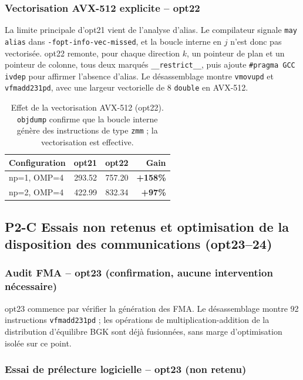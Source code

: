 \documentclass[a4paper,11pt,oneside]{report}
\newcommand{\code}[1]{\texttt{#1}}
\begin{document}
\subsubsection{Vectorisation AVX-512 explicite -- opt22}

La limite principale d'opt21 vient de l'analyse d'alias. Le compilateur signale
\code{may alias} dans \code{-fopt-info-vec-missed}, et la boucle interne en $j$ n'est donc pas vectorisée. opt22 remonte, pour chaque direction $k$, un pointeur de plan
et un pointeur de colonne, tous deux marqués \code{\_\_restrict\_\_}, puis ajoute \code{\#pragma GCC ivdep} pour affirmer l'absence d'alias. Le désassemblage montre \code{vmovupd} et \code{vfmadd231pd}, avec une largeur vectorielle de 8 \code{double} en AVX-512.

\begin{table}[H]
\centering
\begin{tabular}{@{}lrrr@{}}
\toprule
\textbf{Configuration} & \textbf{opt21} & \textbf{opt22} & \textbf{Gain} \\
\midrule
np=1, OMP=4 & 293.52 & 757.20 & \textbf{+158\%} \\
np=2, OMP=4 & 422.99 & 832.34 & \textbf{+97\%} \\
\bottomrule
\end{tabular}
\caption{Effet de la vectorisation AVX-512 (opt22). \texttt{objdump} confirme que la boucle interne génère des instructions de type \texttt{zmm} ; la vectorisation est effective.}
\end{table}

\subsection{P2-C \quad Essais non retenus et optimisation de la disposition des communications (opt23–24)}

\subsubsection{Audit FMA -- opt23 (confirmation, aucune intervention nécessaire)}

opt23 commence par vérifier la génération des FMA. Le désassemblage montre 92 instructions \code{vfmadd231pd} ;
les opérations de multiplication-addition de la distribution d'équilibre BGK sont déjà fusionnées, sans marge d'optimisation isolée sur ce point.

\subsubsection{Essai de prélecture logicielle -- opt23 (non retenu)}
\end{document}
